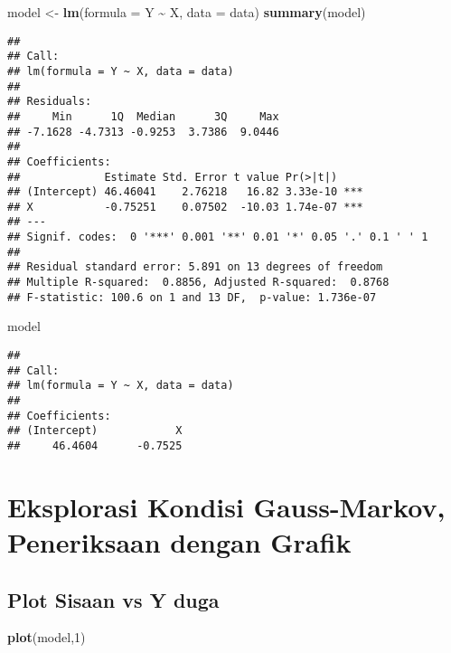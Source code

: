 \documentclass[
]{article}
\newenvironment{Shaded}{\begin{snugshade}}{\end{snugshade}}
\newcommand{\AttributeTok}[1]{\textcolor[rgb]{0.13,0.29,0.53}{#1}}
\newcommand{\DecValTok}[1]{\textcolor[rgb]{0.00,0.00,0.81}{#1}}
\newcommand{\FunctionTok}[1]{\textcolor[rgb]{0.13,0.29,0.53}{\textbf{#1}}}
\newcommand{\NormalTok}[1]{#1}
\newcommand{\OtherTok}[1]{\textcolor[rgb]{0.56,0.35,0.01}{#1}}
\newcommand{\SpecialCharTok}[1]{\textcolor[rgb]{0.81,0.36,0.00}{\textbf{#1}}}
\begin{document}
\begin{Shaded}
\begin{Highlighting}[]
\NormalTok{model }\OtherTok{\textless{}{-}} \FunctionTok{lm}\NormalTok{(}\AttributeTok{formula =}\NormalTok{ Y }\SpecialCharTok{\textasciitilde{}}\NormalTok{ X, }\AttributeTok{data =}\NormalTok{ data)}
\FunctionTok{summary}\NormalTok{(model)}
\end{Highlighting}
\end{Shaded}

\begin{verbatim}
## 
## Call:
## lm(formula = Y ~ X, data = data)
## 
## Residuals:
##     Min      1Q  Median      3Q     Max 
## -7.1628 -4.7313 -0.9253  3.7386  9.0446 
## 
## Coefficients:
##             Estimate Std. Error t value Pr(>|t|)    
## (Intercept) 46.46041    2.76218   16.82 3.33e-10 ***
## X           -0.75251    0.07502  -10.03 1.74e-07 ***
## ---
## Signif. codes:  0 '***' 0.001 '**' 0.01 '*' 0.05 '.' 0.1 ' ' 1
## 
## Residual standard error: 5.891 on 13 degrees of freedom
## Multiple R-squared:  0.8856, Adjusted R-squared:  0.8768 
## F-statistic: 100.6 on 1 and 13 DF,  p-value: 1.736e-07
\end{verbatim}

\begin{Shaded}
\begin{Highlighting}[]
\NormalTok{model}
\end{Highlighting}
\end{Shaded}

\begin{verbatim}
## 
## Call:
## lm(formula = Y ~ X, data = data)
## 
## Coefficients:
## (Intercept)            X  
##     46.4604      -0.7525
\end{verbatim}

\hypertarget{eksplorasi-kondisi-gauss-markov-peneriksaan-dengan-grafik}{%
\section{Eksplorasi Kondisi Gauss-Markov, Peneriksaan dengan
Grafik}\label{eksplorasi-kondisi-gauss-markov-peneriksaan-dengan-grafik}}

\hypertarget{plot-sisaan-vs-y-duga}{%
\subsection{Plot Sisaan vs Y duga}\label{plot-sisaan-vs-y-duga}}

\begin{Shaded}
\begin{Highlighting}[]
\FunctionTok{plot}\NormalTok{(model,}\DecValTok{1}\NormalTok{)}
\end{Highlighting}
\end{Shaded}
\end{document}
